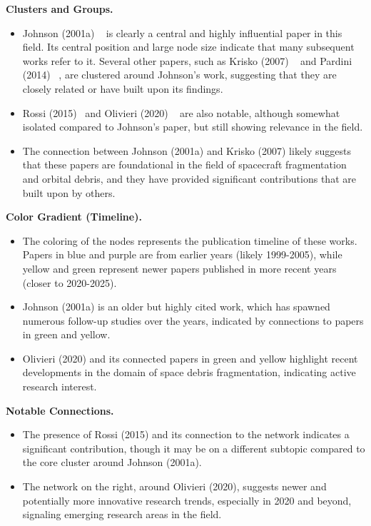 \documentclass[journal ]{new-aiaa}
\begin{document}
\textbf{Clusters and Groups.}

\begin{itemize}
    \item Johnson (2001a) ~\cite{johnson_nasas_2001} is clearly a central and highly influential paper in this field. Its central position and large node size indicate that many subsequent works refer to it. Several other papers, such as Krisko (2007) ~\cite{krisko_predicted_2007} and Pardini (2014) ~\cite{pardini_review_2014}, are clustered around Johnson's work, suggesting that they are closely related or have built upon its findings.
    \item Rossi (2015)~\cite{rossi_criticality_2015} and Olivieri (2020) ~\cite{olivieri_investigation_2021} are also notable, although somewhat isolated compared to Johnson's paper, but still showing relevance in the field.
    \item The connection between Johnson (2001a) and Krisko (2007) likely suggests that these papers are foundational in the field of spacecraft fragmentation and orbital debris, and they have provided significant contributions that are built upon by others.
\end{itemize}

\textbf{Color Gradient (Timeline).}

\begin{itemize}
    \item The coloring of the nodes represents the publication timeline of these works. Papers in blue and purple are from earlier years (likely 1999-2005), while yellow and green represent newer papers published in more recent years (closer to 2020-2025).
    \item Johnson (2001a) is an older but highly cited work, which has spawned numerous follow-up studies over the years, indicated by connections to papers in green and yellow.
    \item Olivieri (2020) and its connected papers in green and yellow highlight recent developments in the domain of space debris fragmentation, indicating active research interest.
\end{itemize}

\textbf{Notable Connections.}

\begin{itemize}
    \item The presence of Rossi (2015) and its connection to the network indicates a significant contribution, though it may be on a different subtopic compared to the core cluster around Johnson (2001a).
    \item The network on the right, around Olivieri (2020), suggests newer and potentially more innovative research trends, especially in 2020 and beyond, signaling emerging research areas in the field.
\end{itemize}
\end{document}
